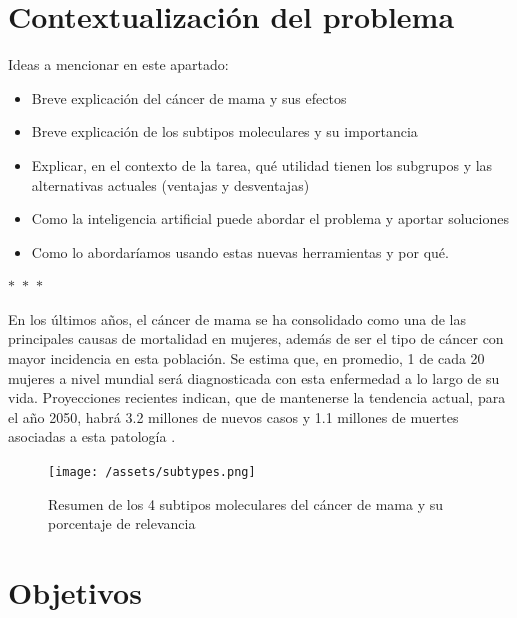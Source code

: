 \documentclass[a4paper,10pt]{book}
\begin{document}
\section{Contextualización del problema}


Ideas a mencionar en este apartado:

\begin{itemize}
  \item Breve explicación del cáncer de mama y sus efectos
  \item Breve explicación de los subtipos moleculares y su importancia
  \item Explicar, en el contexto de la tarea, qué utilidad tienen los subgrupos y las alternativas actuales (ventajas y desventajas)
  \item Como la inteligencia artificial puede abordar el problema y aportar soluciones
  \item Como lo abordaríamos usando estas nuevas herramientas y por qué.
\end{itemize}

\begin{center}
  $\ast$~$\ast$~$\ast$
\end{center}

En los últimos años, el cáncer de mama se ha consolidado como una de las principales causas de mortalidad en mujeres, además de ser el tipo de cáncer con mayor incidencia en esta población. Se estima que, en promedio, 1 de cada 20 mujeres a nivel mundial será diagnosticada con esta enfermedad a lo largo de su vida. Proyecciones recientes indican, que de mantenerse la tendencia actual, para el año 2050, habrá 3.2 millones de nuevos casos y 1.1 millones de muertes asociadas a esta patología \cite{kim_global_2025}.



\begin{figure}
    \centering
    \texttt{[image: /assets/subtypes.png]}
    \caption{Resumen de los 4 subtipos moleculares del cáncer de mama y su porcentaje de relevancia \cite{harnessing_2024}}
    \label{fig:subtypes}
\end{figure}



\newpage

\section{Objetivos}
\end{document}
